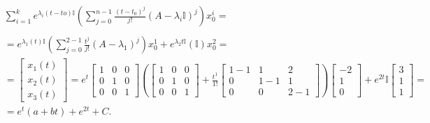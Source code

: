 \documentclass[../main.tex]{subfiles}
\begin{document}
\begin{przyklad}
\begin{align*}
        &\sum_{i=1}^k e^{\lambda_i (t-to)\mathbb{I}}\left( \sum_{j=0}^{n-1} \frac{(t-t_0)^j}{j!} (A-\lambda_i\mathbb{I})^j \right) x_0^i=  \\\\
        &= e^{\lambda_1(t)\mathbb{I}}\left( \sum_{j=0}^{2-1}\frac{t^j}{j!}(A-\lambda_1)^j \right) x_0^1 + e^{\lambda_2 t \mathbb{I}}\left( \mathbb{I} \right)x_0^2=\\
        &= \begin{bmatrix} x_1(t)\\x_2(t)\\x_3(t) \end{bmatrix} = e^{t}\begin{bmatrix} 1&0&0\\0&1&0\\0&0&1 \end{bmatrix} \left( \begin{bmatrix} 1&0&0\\0&1&0\\0&0&1 \end{bmatrix} + \frac{t^1}{1!} \begin{bmatrix} 1-1&1&2\\0&1-1&1\\0&0&2-1 \end{bmatrix} \right) \begin{bmatrix} -2\\1\\0 \end{bmatrix} + e^{2t}\mathbb{I}\begin{bmatrix} 3\\1\\1 \end{bmatrix}=  \\
        &= e^{t}(a+bt) + e^{2t}+C
    .\end{align*}
\end{przyklad}
\end{document}
